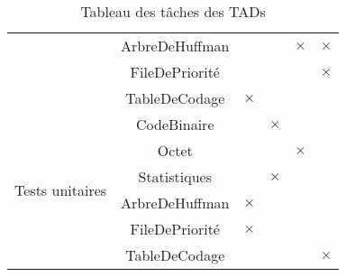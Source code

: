 \begin{table}[ht]
\begin{tabular}{|c|c|>{\centering\arraybackslash}p{1.5cm}|>{\centering\arraybackslash}p{1.5cm}|>{\centering\arraybackslash}p{1.5cm}|>{\centering\arraybackslash}p{1.5cm}|}
        \cline{2-6}
        & ArbreDeHuffman & & & $\times$ & $\times$ \\
        \cline{2-6}
        & FileDePriorité & & & & $\times$ \\
        \cline{2-6}
        & TableDeCodage & $\times$ & & & \\
        \hline
        \multirow{7}{*}{Tests unitaires}
        & CodeBinaire & & $\times$ & & \\
        \cline{2-6}
        & Octet & & & $\times$ & \\
        \cline{2-6}
        & Statistiques & & $\times$ & & \\
        \cline{2-6}
        & ArbreDeHuffman & $\times$ & & & \\
        \cline{2-6}
        & FileDePriorité & $\times$ & & & \\
        \cline{2-6}
        & TableDeCodage & & & & $\times$ \\
        \hline
    \end{tabular}
    \caption{Tableau des tâches des TADs}
  \end{table}  
 

